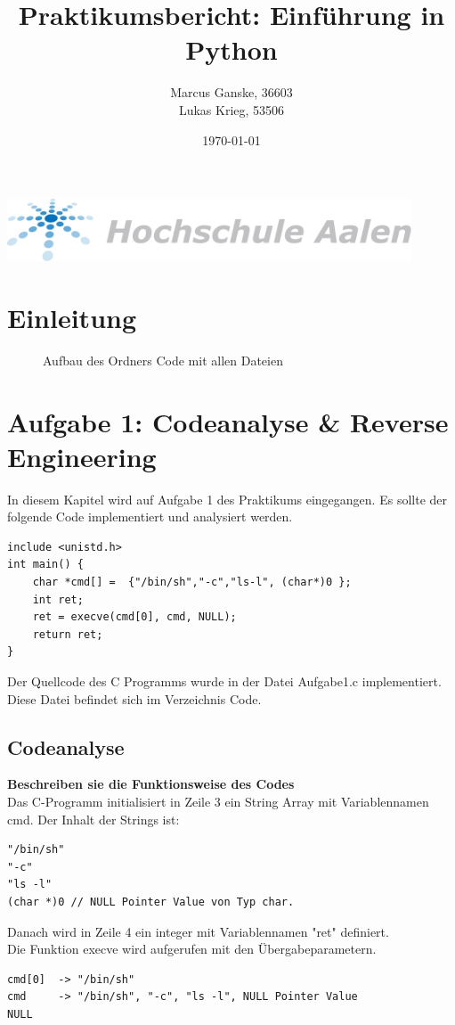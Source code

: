 \documentclass[12pt]{article}
\title{Praktikumsbericht: Einf\"uhrung in Python}
\author{Marcus Ganske, 36603\\
		Lukas Krieg, 53506}
\date{\today}
\begin{document}
\maketitle
\vspace{+8cm}{
}
\includegraphics[width=12cm]{Hochschule-aalen.pdf}

\newpage
\renewcommand\contentsname{Inhaltsverzeichnis}
\tableofcontents
\newpage
	
	\section{Einleitung}
	\begin{figure}[H]
	
		\caption{Aufbau des Ordners Code mit allen Dateien}
	\end{figure}	


\newpage
\section{Aufgabe 1: Codeanalyse \& Reverse Engineering}
In diesem Kapitel wird auf Aufgabe 1 des Praktikums eingegangen.
Es sollte der folgende Code implementiert und analysiert werden.
\begin{lstlisting}
include <unistd.h>
int main() {
	char *cmd[] =  {"/bin/sh","-c","ls-l", (char*)0 };
	int ret;
	ret = execve(cmd[0], cmd, NULL);
	return ret;
}
\end{lstlisting}

Der Quellcode des C Programms wurde in der Datei Aufgabe1.c implementiert.
Diese Datei befindet sich im Verzeichnis Code.

\subsection{Codeanalyse}
\textbf{Beschreiben sie die Funktionsweise des Codes}\\
Das C-Programm initialisiert in Zeile 3 ein String Array mit Variablennamen cmd. 
Der Inhalt der Strings ist: \\
\begin{lstlisting}
"/bin/sh"
"-c"
"ls -l"
(char *)0 // NULL Pointer Value von Typ char.
\end{lstlisting}
Danach wird in Zeile 4 ein integer mit Variablennamen "ret" definiert.\\
Die Funktion execve wird aufgerufen mit den Übergabeparametern.
\begin{lstlisting}
cmd[0] 	-> "/bin/sh"
cmd		-> "/bin/sh", "-c", "ls -l", NULL Pointer Value
NULL	 
\end{lstlisting}
\end{document}
